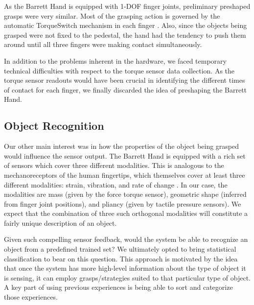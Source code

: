 As the Barrett Hand is equipped with 1-DOF finger joints, preliminary preshaped grasps were very similar. Most of the grasping action is governed by the automatic TorqueSwitch\texttrademark\; mechanism in each finger \cite{manual}. Also, since the objects being grasped were not fixed to the pedestal, the hand had the tendency to push them around until all three fingers were making contact simultaneously.  

In addition to the problems inherent in the hardware, we faced temporary technical difficulties with respect to the torque sensor data collection. As the torque sensor readouts would have been crucial in identifying the different times of contact for each finger, we finally discarded the idea of preshaping the Barrett Hand.

\subsection*{Object Recognition}
Our other main interest was in how the properties of the object being grasped would influence the sensor output. The Barrett Hand is equipped with a rich set of sensors which cover three different modalities. This is analogous to the mechanoreceptors of the human fingertips, which themselves cover at least three different modalities: strain, vibration, and rate of change \cite{SkinTouch}. In our case, the modalities are mass (given by the force torque sensor), geometric shape (inferred from finger joint positions), and pliancy (given by tactile pressure sensors). We expect that the combination of three such orthogonal modalities will constitute a fairly unique description of an object.

Given such compelling sensor feedback, would the system be able to recognize an object from a predefined trained set? We ultimately opted to bring statistical classification to bear on this question. This approach is motivated by the idea that once the system has more high-level information about the type of object it is sensing, it can employ grasps/strategies suited to that particular type of object. A key part of using previous experiences is being able to sort and categorize those experiences.

